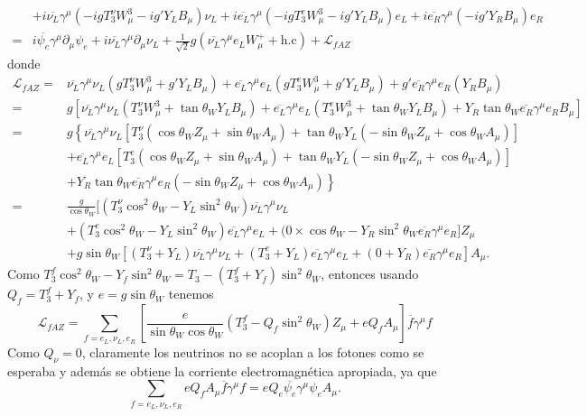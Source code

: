 \begin{itemize}
\begin{align}
&+i\overline{\nu_L}\gamma^\mu(-igT_3^\nu W^3_\mu-ig'Y_LB_\mu)\nu_L+i\overline{e_L}\gamma^\mu(-igT_3^eW^3_\mu-ig'Y_LB_\mu)e_L
+i\overline{e_R}\gamma^\mu(-ig'Y_R B_\mu)e_R
\nonumber\\
=&i\overline{\psi_e}\gamma^\mu\partial_\mu\psi_e+i\overline{\nu_L}\gamma^\mu\partial_\mu\nu_L
+\frac{1}{\sqrt{2}}g\left(\overline{\nu_L}\gamma^\mu e_LW^+_\mu+\text{h.c}\right)+\mathcal{L}_{fAZ}
\end{align}
donde
\begin{align}
\mathcal{L}_{fAZ}=&\overline{\nu_L}\gamma^\mu\nu_L(gT_3^\nu W^3_\mu+g'Y_LB_\mu)+\overline{e_L}\gamma^\mu e_L(gT_3^eW^3_\mu+g'Y_LB_\mu)
+g'\overline{e_R}\gamma^\mu e_R(Y_R B_\mu)
\nonumber\\
=&g\left[\overline{\nu_L}\gamma^\mu\nu_L(T_3^\nu W^3_\mu+\tan\theta_WY_LB_\mu)+\overline{e_L}\gamma^\mu e_L(T_3^eW^3_\mu+\tan\theta_WY_LB_\mu)
+Y_R\tan\theta_W\overline{e_R}\gamma^\mu e_RB_\mu\right]\nonumber\\
=&g\left\{\overline{\nu_L}\gamma^\mu\nu_L[T_3^\nu(\cos\theta_WZ_\mu+\sin\theta_WA_\mu)+\tan\theta_WY_L(-\sin\theta_WZ_\mu+\cos\theta_WA_\mu)]\right.\nonumber\\
&+\overline{e_L}\gamma^\mu e_L[T_3^e(\cos\theta_WZ_\mu+\sin\theta_WA_\mu)+\tan\theta_WY_L(-\sin\theta_WZ_\mu+\cos\theta_WA_\mu)]\nonumber\\
&\left.+Y_R\tan\theta_W\overline{e_R}\gamma^\mu e_R(-\sin\theta_WZ_\mu+\cos\theta_WA_\mu)\right\} 
\nonumber\\
=&\frac{g}{\cos\theta_W}[(T_3^\nu\cos^2\theta_W-Y_L\sin^2\theta_W )\overline{\nu_L}\gamma^\mu\nu_L\nonumber\\
&+(T^e_3\cos^2\theta_W-Y_L\sin^2\theta_W)\overline{e_L}\gamma^\mu e_L+(0\times\cos\theta_W-Y_R\sin^2\theta_W\overline{e_R}\gamma^\mu e_R]Z_\mu\nonumber\\
&+g\sin\theta_W[(T^\nu_3+Y_L)\overline{\nu_L}\gamma^\mu\nu_L+(T_3^e+Y_L)\overline{e_L}\gamma^\mu e_L+(0+Y_R)\overline{e_R}\gamma^\mu e_R]A_\mu.
\end{align}
Como $T_3^f\cos^2\theta_W-Y_f\sin^2\theta_W=T_3-(T_3^f+Y_f)\sin^2\theta_W$, entonces usando $Q_f=T_3^f+Y_f$, y $e=g\sin\theta_W$ tenemos
\begin{equation}
\mathcal{L}_{fAZ}=\sum_{f=e_L,\nu_L,e_R}\left[\frac{e}{\sin\theta_W\cos\theta_W}(T_3^f-Q_f\sin^2\theta_W )Z_\mu+eQ_fA_\mu\right]\overline{f}\gamma^\mu f
\end{equation}
Como $Q_\nu=0$, claramente los neutrinos no se acoplan a los fotones como se esperaba y adem\'as se obtiene la corriente electromagn\'etica apropiada, ya que
\begin{equation}
  \sum_{f=e_L,\nu_L,e_R}eQ_fA_\mu\overline{f}\gamma^\mu f=eQ_e\overline{\psi_e}\gamma^\mu\psi_eA_\mu.
\end{equation}
 
\end{itemize}






